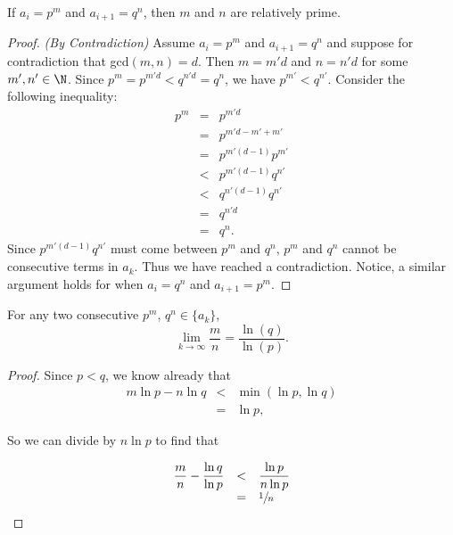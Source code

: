 \documentclass[a5paper]{article}
\begin{document}
\begin{lemma}
    If $a_i = p^m$ and $a_{i+1} = q^n$, then $m$ and $n$ are relatively prime.
\begin{proof}\textit{(By Contradiction)} 
    Assume $a_i = p^m$ and $a_{i+1} = q^n$ and suppose for contradiction that gcd$(m,n) = d$. Then $m = m'd$ and $n = n'd$ for some $m', n' \in \N$. Since $p^m = p^{m'd} < q^{n'd} = q^n$, we have $p^{m'} < q^{n'}$. Consider the following inequality:
    \[
    \begin{array}{rcl}
        p^m & = & p^{m'd}\\
        & = & p^{m'd - m' + m'}\\
        & = & p^{m'(d-1)}p^{m'} \\
        & < & p^{m'(d-1)}q^{n'} \\
        & < & q^{n'(d-1)}q^{n'} \\
        & = & q^{n'd} \\
        & = & q^n.
    \end{array}
    \]
    Since $p^{m'(d-1)}q^{n'}$ must come between $p^m$ and $q^n$, $p^m$ and $q^n$ cannot be consecutive terms in ${a_k}$. Thus we have reached a contradiction. Notice, a similar argument holds for when $a_i = q^n$ and $a_{i+1} = p^m$.
    
\end{proof}
\end{lemma}

\begin{lemma}For any two consecutive $p^m$, $q^n \in \{a_k\}$, 
$$\lim_{k \to \infty} \frac{m}{n} = \frac{\ln(q)}{\ln(p)}.$$
\begin{proof}
Since $p<q$, we know already that 
\[
    \begin{array}{rcl}
       m\ln{p}-n\ln{q} & < & \min(\ln{p},\ln{q})\\
                     & = & \ln{p},
    \end{array}
\]

So we can divide by $n\ln{p}$ to find that 

\[
    \begin{array}{rcl}
       \dfrac{m}{n}-\dfrac{\ln{q}}{\ln{p}} & < & \dfrac{\ln{p}}{n\ln{p}}\\
       & = & \sfrac{1}{n}
    \end{array}
\]
\end{proof}
\end{lemma}

\pagebreak
\end{document}
